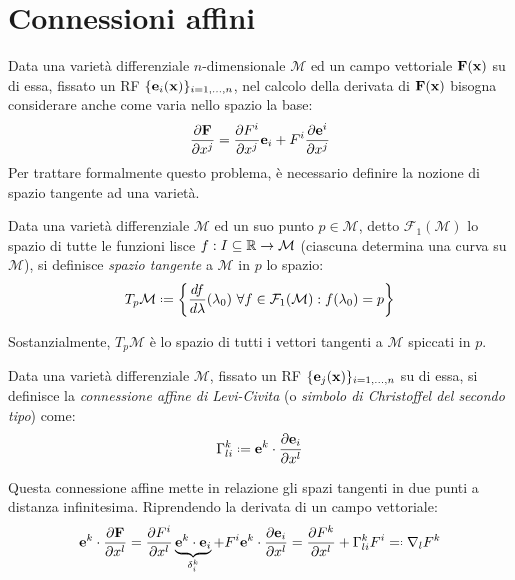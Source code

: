 
\section{Connessioni affini}

Data una varietà differenziale $ n $-dimensionale $ \mathcal{M} $ ed un campo vettoriale $ \mathbf{F}(\mathbf{x}) $ su di essa, fissato un RF $ \{\mathbf{e}_i (\mathbf{x})\}_{i = 1, \dots, n} $, nel calcolo della derivata di $ \mathbf{F}(\mathbf{x}) $ bisogna considerare anche come varia nello spazio la base:
\begin{equation}
	\frac{\partial \mathbf{F}}{\partial x^j} = \frac{\partial F^i}{\partial x^j} \mathbf{e}_i + F^i \frac{\partial \mathbf{e}^i}{\partial x^j}
	\label{eq:4.1}
\end{equation}
Per trattare formalmente questo problema, è necessario definire la nozione di spazio tangente ad una varietà.
\begin{definition}
	Data una varietà differenziale $ \mathcal{M} $ ed un suo punto $ p \in \mathcal{M} $, detto $ \mathcal{F}_1(\mathcal{M}) $ lo spazio di tutte le funzioni lisce $ f : I \subseteq \mathbb{R} \rightarrow \mathcal{M} $ (ciascuna determina una curva su $ \mathcal{M} $), si definisce \textit{spazio tangente} a $ \mathcal{M} $ in $ p $ lo spazio:
	\begin{equation}
		T_p\mathcal{M} \defeq \biggl\{ \frac{df}{d\lambda}(\lambda_0) \,\,\forall f \in \mathcal{F}_1(\mathcal{M}) : f(\lambda_0) = p \biggl\}
		\label{eq:4.2}
	\end{equation}
\end{definition}
Sostanzialmente, $ T_p\mathcal{M} $ è lo spazio di tutti i vettori tangenti a $ \mathcal{M} $ spiccati in $ p $.
\begin{definition}
	Data una varietà differenziale $ \mathcal{M} $, fissato un RF $ \{\mathbf{e}_j(\mathbf{x})\}_{i = 1, \dots, n} $ su di essa, si definisce la \textit{connessione affine di Levi-Civita} (o \textit{simbolo di Christoffel del secondo tipo}) come:
	\begin{equation}
		\Gamma^k_{li} \defeq \ve{e}^k \cdot \frac{\pa \ve{e}_i}{\pa x^l}
		\label{eq:4.3}
	\end{equation}
\end{definition}
Questa connessione affine mette in relazione gli spazi tangenti in due punti a distanza infinitesima.
Riprendendo la derivata di un campo vettoriale:
\begin{equation}
	\ve{e}^k \cdot \frac{\pa \ve{F}}{\pa x^l} = \frac{\pa F^i}{\pa x^l} \underbrace{\ve{e}^k \cdot \ve{e}_i}_{\delta^k_i} + F^i \ve{e}^k \cdot \frac{\pa \ve{e}_i}{\pa x^l} = \frac{\pa F^k}{\pa x^l} + \Gamma^k_{li} F^i \eqdef \nabla_l F^k
	\label{eq:4.4}
\end{equation}
